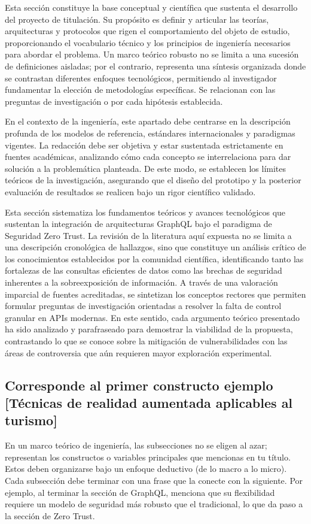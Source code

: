 \documentclass[12pt]{article}
\begin{document}
Esta sección constituye la base conceptual y científica que sustenta el desarrollo del proyecto de titulación. Su propósito es definir y articular las teorías, arquitecturas y protocolos que rigen el comportamiento del objeto de estudio, proporcionando el vocabulario técnico y los principios de ingeniería necesarios para abordar el problema. Un marco teórico robusto no se limita a una sucesión de definiciones aisladas; por el contrario, representa una síntesis organizada donde se contrastan diferentes enfoques tecnológicos, permitiendo al investigador fundamentar la elección de metodologías específicas.
Se relacionan con las preguntas de investigación o por cada hipótesis establecida.

En el contexto de la ingeniería, este apartado debe centrarse en la descripción profunda de los modelos de referencia, estándares internacionales y paradigmas vigentes. La redacción debe ser objetiva y estar sustentada estrictamente en fuentes académicas, analizando cómo cada concepto se interrelaciona para dar solución a la problemática planteada. De este modo, se establecen los límites teóricos de la investigación, asegurando que el diseño del prototipo y la posterior evaluación de resultados se realicen bajo un rigor científico validado.

{\color{blue}Esta sección sistematiza los fundamentos teóricos y avances tecnológicos que sustentan la integración de arquitecturas GraphQL bajo el paradigma de Seguridad Zero Trust. La revisión de la literatura aquí expuesta no se limita a una descripción cronológica de hallazgos, sino que constituye un análisis crítico de los conocimientos establecidos por la comunidad científica, identificando tanto las fortalezas de las consultas eficientes de datos como las brechas de seguridad inherentes a la sobreexposición de información. A través de una valoración imparcial de fuentes acreditadas, se sintetizan los conceptos rectores que permiten formular preguntas de investigación orientadas a resolver la falta de control granular en APIs modernas. En este sentido, cada argumento teórico presentado ha sido analizado y parafraseado para demostrar la viabilidad de la propuesta, contrastando lo que se conoce sobre la mitigación de vulnerabilidades con las áreas de controversia que aún requieren mayor exploración experimental.}

\subsection{Corresponde al primer constructo ejemplo [Técnicas de realidad aumentada aplicables al turismo]}
En un marco teórico de ingeniería, las subsecciones no se eligen al azar; representan los constructos o variables principales que mencionas en tu título. Estos deben organizarse bajo un enfoque deductivo (de lo macro a lo micro).
{\color{blue}Cada subsección debe terminar con una frase que la conecte con la siguiente. Por ejemplo, al terminar la sección de GraphQL, menciona que su flexibilidad requiere un modelo de seguridad más robusto que el tradicional, lo que da paso a la sección de Zero Trust.}
\end{document}
